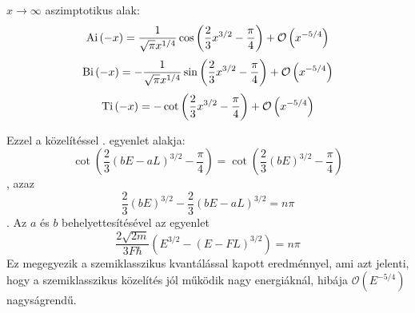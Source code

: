 $x \to \infty$ aszimptotikus alak:
	\begin{equation}
		\mathrm{Ai}\left(-x\right) = \frac{1}{\sqrt{\pi}x^{1/4}}\cos\left(\frac{2}{3}x^{3/2} - \frac{\pi}{4}\right) + \mathcal{O}\left(x^{-5/4}\right)
	\end{equation}
	\begin{equation}
		\mathrm{Bi}\left(-x\right) = -\frac{1}{\sqrt{\pi}x^{1/4}}\sin\left(\frac{2}{3}x^{3/2} - \frac{\pi}{4}\right) + \mathcal{O}\left(x^{-5/4}\right)
	\end{equation}
	\begin{equation}
		\mathrm{Ti}\left(-x\right) = -\cot\left( \frac{2}{3}x^{3/2} - \frac{\pi}{4} \right) + \mathcal{O}\left(x^{-5/4}\right)
	\end{equation}
	
	Ezzel a közelítéssel . egyenlet alakja:
	\begin{equation}
		\cot\left(\frac{2}{3}\left(bE-aL\right)^{3/2} - \frac{\pi}{4}\right) = \cot\left(\frac{2}{3}\left(bE\right)^{3/2} - \frac{\pi}{4}\right)
	\end{equation}
	, azaz
	\begin{equation}
		\frac{2}{3}\left(bE\right)^{3/2} - \frac{2}{3}\left(bE-aL\right)^{3/2} = n\pi
	\end{equation}
	. Az $a$ és $b$ behelyettesítésével az egyenlet
	\begin{equation}
		\frac{2\sqrt{2m}}{3F\hbar}\left(E^{3/2} - \left(E - FL\right)^{3/2}\right) = n\pi
	\end{equation}
	Ez megegyezik a szemiklasszikus kvantálással kapott eredménnyel, ami azt jelenti, hogy a szemiklasszikus közelítés jól működik nagy energiáknál, hibája $\mathcal{O}\left(E^{-5/4}\right)$ nagyságrendű.

